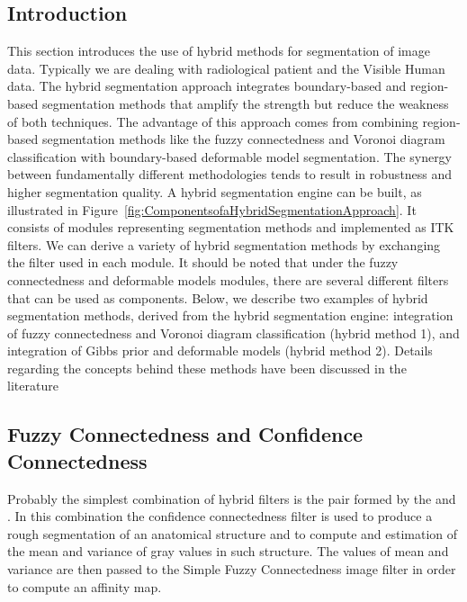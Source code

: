 %
%
% 
%
%
%

\subsection{Introduction}
\label{sec:HybridSegmentationIntroduction}
This section introduces the use of hybrid methods for segmentation of image
data. Typically we are dealing with radiological patient and the Visible
Human data. The hybrid segmentation approach integrates boundary-based and
region-based segmentation methods that amplify the strength but reduce the
weakness of both techniques. The advantage of this approach comes from
combining region-based segmentation methods like the fuzzy connectedness and
Voronoi diagram classification with boundary-based deformable model
segmentation. The synergy between fundamentally different methodologies tends
to result in robustness and higher segmentation quality.  A hybrid
segmentation engine can be built, as illustrated in
Figure~\ref{fig:ComponentsofaHybridSegmentationApproach}. It consists of
modules representing segmentation methods and implemented as ITK filters. We
can derive a variety of hybrid segmentation methods by exchanging the filter
used in each module. It should be noted that under the fuzzy connectedness
and deformable models modules, there are several different filters that can
be used as components. Below, we describe two examples of hybrid segmentation
methods, derived from the hybrid segmentation engine: integration of fuzzy
connectedness and Voronoi diagram classification (hybrid method 1), and
integration of Gibbs prior and deformable models (hybrid method 2).  Details
regarding the concepts behind these methods have been discussed in the
literature
\cite{Angelini2002,Udupa2002,Jin2002,Imielinska2001,Imielinska2000a,Imielinska2000b}


\subsection{Fuzzy Connectedness and Confidence Connectedness }

Probably the simplest combination of hybrid filters is the pair formed by the
 and
. In this combination the
confidence connectedness filter is used to produce a rough segmentation of an
anatomical structure and to compute and estimation of the mean and variance of
gray values in such structure. The values of mean and variance are then passed
to the Simple Fuzzy Connectedness image filter in order to compute an affinity map.

